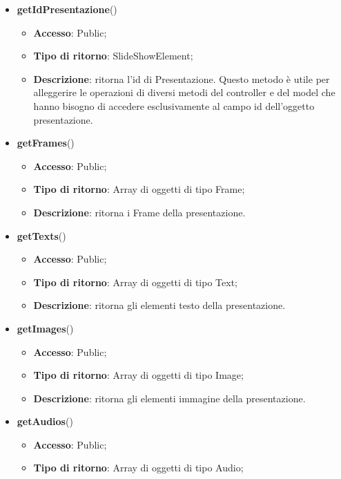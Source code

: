 {\begin{itemize}
\begin{itemize}
				\item \textbf{Tipo di ritorno}: SlideShowElement;
				\item \textbf{Descrizione}: ritorna il nome di Presentazione.
			\end{itemize}
			\item \textbf{getIdPresentazione}()
			\begin{itemize}
				\item \textbf{Accesso}: Public;
				\item \textbf{Tipo di ritorno}: SlideShowElement;
				\item \textbf{Descrizione}: ritorna l'id di Presentazione. Questo metodo è utile per alleggerire le operazioni di diversi metodi del controller e del model che hanno bisogno di accedere esclusivamente al campo id dell'oggetto presentazione. 
			\end{itemize}
			\item \textbf{getFrames}()
			\begin{itemize}
				\item \textbf{Accesso}: Public;
				\item \textbf{Tipo di ritorno}: Array di oggetti di tipo Frame;
				\item \textbf{Descrizione}: ritorna i Frame della presentazione.
			\end{itemize}
			\item \textbf{getTexts}()
			\begin{itemize}
				\item \textbf{Accesso}: Public;
				\item \textbf{Tipo di ritorno}: Array di oggetti di tipo Text;
				\item \textbf{Descrizione}: ritorna gli elementi testo della presentazione.
			\end{itemize}
			\item \textbf{getImages}()
			\begin{itemize}
				\item \textbf{Accesso}: Public;
				\item \textbf{Tipo di ritorno}: Array di oggetti di tipo Image;
				\item \textbf{Descrizione}: ritorna gli elementi immagine della presentazione.
			\end{itemize}
			\item \textbf{getAudios}()
			\begin{itemize}
				\item \textbf{Accesso}: Public;
				\item \textbf{Tipo di ritorno}: Array di oggetti di tipo Audio;

\end{itemize}
\end{itemize}}
